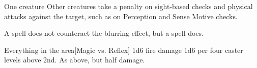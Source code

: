\begin{spellheader}
    \spellrng{\rngclose}
    \spelldur{\durshort \dismissable}
\end{spellheader}
\begin{spelleffects}
    \begin{spelltarget}{One creature}
        \spelleffect Other creatures take a  penalty on sight-based checks and physical attacks against the target, such as on Perception and Sense Motive checks.
    \end{spelltarget}
\end{spelleffects}
\begin{spellfooter}
    \spellnotes A  spell does not counteract the blurring effect, but a  spell does.
\end{spellfooter}

\begin{spellheader}
\end{spellheader}
\begin{spelleffects}
    \begin{spelltargets}{Everything in the area}[Magic vs. Reflex]
        \spellsuccess 1d6 fire damage \add 1d6 per four caster levels above 2nd.
        \spellfailure As above, but half damage.
    \end{spelltargets}
\end{spelleffects}

\begin{comment}
\subsubsection{C}
\end{comment}

